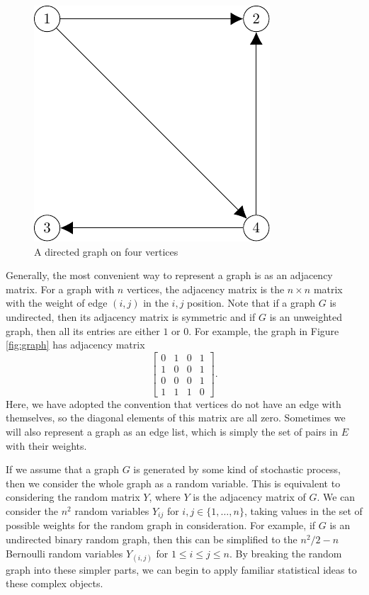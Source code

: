 \documentclass[12pt,twoside]{reedthesis}
\theoremstyle{definition}
\theoremstyle{definition}
\theoremstyle{remark}
\begin{document}
\begin{figure}

{\centering \includegraphics{figure/small_net_di} 

}

\caption{A directed graph on four vertices}\label{fig:digraph}
\end{figure}
Generally, the most convenient way to represent a graph is as an
adjacency matrix. For a graph with \(n\) vertices, the adjacency matrix
is the \(n \times n\) matrix with the weight of edge \((i,j)\) in the
\(i, j\) position. Note that if a graph \(G\) is undirected, then its
adjacency matrix is symmetric and if \(G\) is an unweighted graph, then
all its entries are either \(1\) or \(0\). For example, the graph in
Figure \ref{fig:graph} has adjacency matrix
\begin{equation}
\begin{bmatrix}
0 & 1 & 0 & 1 \\
1 & 0 & 0 & 1 \\
0 & 0 & 0 & 1 \\
1 & 1 & 1 & 0
\end{bmatrix}.
\label{eq:adj-mat}
\end{equation}
Here, we have adopted the convention that vertices do not have an edge
with themselves, so the diagonal elements of this matrix are all zero.
Sometimes we will also represent a graph as an edge list, which is
simply the set of pairs in \(E\) with their weights.

If we assume that a graph \(G\) is generated by some kind of stochastic
process, then we consider the whole graph as a random variable. This is
equivalent to considering the random matrix \(Y\), where \(Y\) is the
adjacency matrix of \(G\). We can consider the \(n^2\) random variables
\(Y_{ij}\) for \(i, j \in \{1, \dots, n\}\), taking values in the set of
possible weights for the random graph in consideration. For example, if
\(G\) is an undirected binary random graph, then this can be simplified
to the \(n^2/2 - n\) Bernoulli random variables \(Y_{(i, j)}\) for
\(1 \leq i \leq j \leq n\). By breaking the random graph into these
simpler parts, we can begin to apply familiar statistical ideas to these
complex objects.
\end{document}
